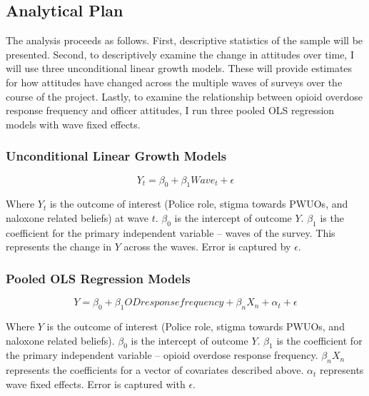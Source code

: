 \subsection{Analytical Plan}

The analysis proceeds as follows. First, descriptive statistics of the sample will be presented. Second, to descriptively examine the change in attitudes over time, I will use three unconditional linear growth models. These will provide estimates for how attitudes have changed across the multiple waves of surveys over the course of the project. Lastly, to examine the relationship between opioid overdose response frequency and officer attitudes, I run three pooled OLS regression models with wave fixed effects.

\subsubsection{Unconditional Linear Growth Models}

\[Y_t = \beta_0 + \beta_1 Wave_t + \epsilon \]

Where \(Y_t\) is the outcome of interest (Police role, stigma towards PWUOs, and naloxone related beliefs) at wave \(t\). \(\beta_0\) is the intercept of outcome \(Y\). \(\beta_1\) is the coefficient for the primary independent variable -- waves of the survey. This represents the change in \(Y\) across the waves. Error is captured by \(\epsilon\).

\subsubsection{Pooled OLS Regression Models}

\[Y = \beta_0 + \beta_1 OD response frequency + \beta_n X_n + \alpha_t + \epsilon \]

Where \(Y\) is the outcome of interest (Police role, stigma towards PWUOs, and naloxone related beliefs). \(\beta_0\) is the intercept of outcome \(Y\). \(\beta_1\) is the coefficient for the primary independent variable -- opioid overdose response frequency. \(\beta_n X_n\) represents the coefficients for a vector of covariates described above. \(\alpha_t\) represents wave fixed effects. Error is captured with \(\epsilon\).

